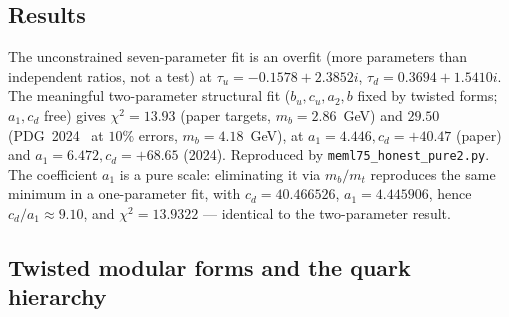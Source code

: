 \documentclass[12pt,a4paper]{article}
\numberwithin{equation}{section}
\begin{document}
\subsection{Results}
The unconstrained seven-parameter fit is an overfit
(more parameters than independent ratios, not a test)
at \(\tau_u = -0.1578 + 2.3852i\), \(\tau_d = 0.3694 + 1.5410i\).
The meaningful
two-parameter structural fit (\(b_u, c_u, a_2, b\) fixed by twisted
forms; \(a_1, c_d\) free) gives \(\chi^2 = 13.93\) (paper targets,
\(m_b=2.86\)~GeV) and \(29.50\) (PDG~2024~\cite{PDG2024} at \(10\%\)
errors, \(m_b=4.18\)~GeV), at
\(a_1=4.446, c_d=+40.47\) (paper) and \(a_1=6.472, c_d=+68.65\) (2024).
Reproduced by \texttt{meml75\_honest\_pure2.py}. The coefficient
\(a_1\) is a pure scale: eliminating it via \(m_b/m_t\) reproduces
the same minimum in a one-parameter fit, with
\(c_d = 40.466526\), \(a_1 = 4.445906\), hence
\(c_d/a_1 \approx 9.10\), and
\(\chi^2 = 13.9322\) --- identical to the two-parameter result.

\subsection{Twisted modular forms and the quark hierarchy}
\label{sec:twisted_forms}
\end{document}
